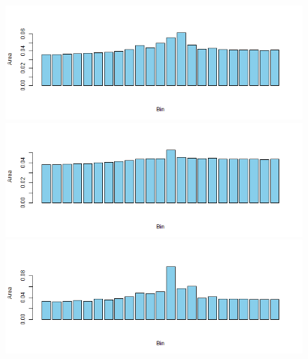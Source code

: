 \documentclass[11pt]{article}
\theoremstyle{plain}
\theoremstyle{definition}
\begin{document}
\begin{figure}[H]
\begin{center}
\includegraphics[trim ={3.5cm 2.7cm 2cm 2cm},scale=.6, clip=true]{Binned_Areas10.png}
\includegraphics[trim ={3.5cm 2.7cm 2cm 2cm},scale=.6, clip=true]{Binned_Areas11.png}
\includegraphics[trim ={3.5cm 2.7cm 2cm 2cm},scale=.6, clip=true]{Binned_Areas12.png}
\end{center}
\end{figure}
\end{document}
